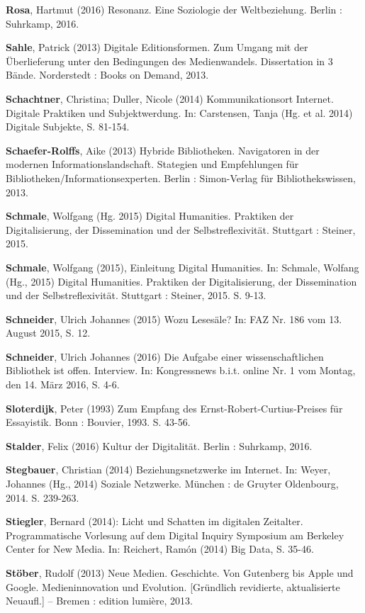 \documentclass[a4paper,
fontsize=11pt,
oneside,
numbers=noperiodatend,
parskip=half-,
bibliography=totoc,
final
]{scrartcl}
\begin{document}
\textbf{Rosa}, Hartmut (2016) Resonanz. Eine Soziologie der
Weltbeziehung. Berlin : Suhrkamp, 2016.

\textbf{Sahle}, Patrick (2013) Digitale Editionsformen. Zum Umgang mit
der Überlieferung unter den Bedingungen des Medienwandels. Dissertation
in 3 Bände. Norderstedt : Books on Demand, 2013.

\textbf{Schachtner}, Christina; Duller, Nicole (2014) Kommunikationsort
Internet. Digitale Praktiken und Subjektwerdung. In: Carstensen, Tanja
(Hg. et al. 2014) Digitale Subjekte, S. 81-154.

\textbf{Schaefer-Rolffs}, Aike (2013) Hybride Bibliotheken. Navigatoren
in der modernen Informationslandschaft. Stategien und Empfehlungen für
Bibliotheken/Informationsexperten. Berlin : Simon-Verlag für
Bibliothekswissen, 2013.

\textbf{Schmale}, Wolfgang (Hg. 2015) Digital Humanities. Praktiken der
Digitalisierung, der Dissemination und der Selbstreflexivität. Stuttgart
: Steiner, 2015.

\textbf{Schmale}, Wolfgang (2015), Einleitung Digital Humanities. In:
Schmale, Wolfang (Hg., 2015) Digital Humanities. Praktiken der
Digitalisierung, der Dissemination und der Selbstreflexivität. Stuttgart
: Steiner, 2015. S. 9-13.

\textbf{Schneider}, Ulrich Johannes (2015) Wozu Lesesäle? In: FAZ Nr.
186 vom 13. August 2015, S. 12.

\textbf{Schneider}, Ulrich Johannes (2016) Die Aufgabe einer
wissenschaftlichen Bibliothek ist offen. Interview. In: Kongressnews
b.i.t. online Nr. 1 vom Montag, den 14. März 2016, S. 4-6.

\textbf{Sloterdijk}, Peter (1993) Zum Empfang des
Ernst-Robert-Curtius-Preises für Essayistik. Bonn : Bouvier, 1993. S.
43-56.

\textbf{Stalder}, Felix (2016) Kultur der Digitalität. Berlin :
Suhrkamp, 2016.

\textbf{Stegbauer}, Christian (2014) Beziehungsnetzwerke im Internet.
In: Weyer, Johannes (Hg., 2014) Soziale Netzwerke. München : de Gruyter
Oldenbourg, 2014. S. 239-263.

\textbf{Stiegler}, Bernard (2014): Licht und Schatten im digitalen
Zeitalter. Programmatische Vorlesung auf dem Digital Inquiry Symposium
am Berkeley Center for New Media. In: Reichert, Ramón (2014) Big Data,
S. 35-46.

\textbf{Stöber}, Rudolf (2013) Neue Medien. Geschichte. Von Gutenberg
bis Apple und Google. Medieninnovation und Evolution. {[}Gründlich
revidierte, aktualisierte Neuaufl.{]} -- Bremen : edition lumière, 2013.
\end{document}
